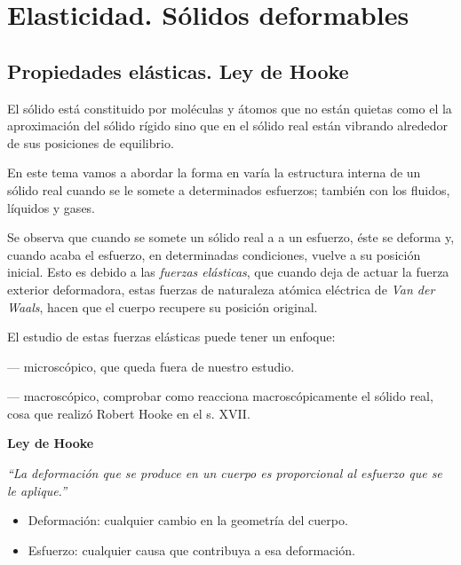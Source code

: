 \chapter{Elasticidad. Sólidos deformables}

\vspace{10mm} %
\section[Propiedades elásticas. Ley de Hooke]{Propiedades elásticas. Ley de Hooke}

\vspace{5mm} %
El sólido está constituido por moléculas y átomos que no están quietas como el la aproximación del sólido rígido sino que en el sólido real están vibrando alrededor de sus posiciones de equilibrio.

En este tema vamos a abordar la forma en varía la estructura interna de un sólido real cuando se le somete a determinados esfuerzos; también con los fluidos, líquidos y gases.

\begin{miparrafo}
Se observa que cuando se somete un sólido real a a un esfuerzo, éste se deforma y, cuando acaba el esfuerzo, en determinadas condiciones, vuelve a su posición inicial. Esto es debido a las \emph{fuerzas elásticas}, que cuando deja de actuar la fuerza exterior deformadora, estas fuerzas de naturaleza atómica eléctrica de \emph{Van der Waals}, hacen que el cuerpo recupere su posición original.
\end{miparrafo}
	
El estudio de estas fuerzas elásticas puede tener un enfoque:

--- microscópico, que queda fuera de nuestro estudio.

--- macroscópico, comprobar como reacciona macroscópicamente el sólido real, cosa que realizó Robert Hooke en el s. XVII.


\textbf{Ley de Hooke}

\begin{miparrafodestacado}
\emph{``La deformación que se produce en un cuerpo es proporcional al esfuerzo que se le aplique.''}	
\end{miparrafodestacado}

\begin{itemize}
\item Deformación: cualquier cambio en la geometría del cuerpo.
\item Esfuerzo: cualquier causa	que contribuya a esa deformación.
\end{itemize}

